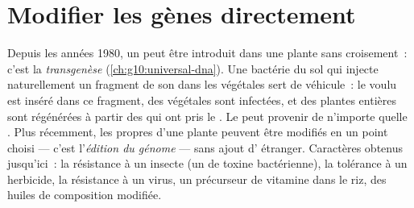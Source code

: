 \section{Modifier les gènes directement}

\begin{proposition}\label{prop:g12:domesticated-plants:transgenic}
Depuis les années 1980, un  peut être introduit dans une plante
sans croisement~: c'est la \emph{transgenèse}
(\cref{ch:g10:universal-dna}). Une bactérie du sol qui injecte
naturellement un fragment de son  dans les  végétales sert
de véhicule~: le  voulu est inséré dans ce fragment, des 
végétales sont infectées, et des plantes entières sont régénérées à
partir des  qui ont pris le . Le  peut provenir de
n'importe quelle . Plus récemment, les  propres d'une
plante peuvent être modifiés en un point choisi --- c'est
l'\emph{édition du génome} --- sans ajout d' étranger. Caractères
obtenus jusqu'ici~: la résistance à un insecte (un  de toxine
bactérienne), la tolérance à un herbicide, la résistance à un virus,
un précurseur de vitamine dans le riz, des huiles de composition
modifiée.
\end{proposition}
\admitted

